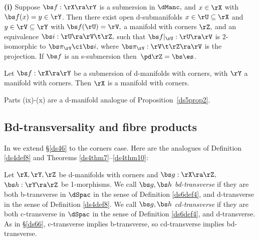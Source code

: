 \documentclass{article}
\begin{document}
\begin{thm}{\bf(i)}
 Suppose\/ $\bs f:\rX\ra\rY$ is a submersion in
$\dManc,$ and\/ $x\in\rX$ with\/ $\bs f(x)=y\in\rY$. Then there
exist open d-submanifolds $x\in\rU\subseteq\rX$ and\/
$y\in\rV\subseteq\rY$ with\/ $\bs f(\rU)=\rV,$ a manifold with
corners\/ $\rZ,$ and an equivalence $\bs i:\rU\ra\rV\t\rZ,$ such
that\/ $\bs f\vert_\rU:\rU\ra\rV$ is $2$-isomorphic to
$\bs\pi_\rV\ci\bs i,$ where $\bs\pi_\rV:\rV\t\rZ\ra\rV$ is the
projection. If\/ $\bs f$ is an s-submersion then\/~$\pd\rZ=\bs\es$.
\smallskip

 Let\/ $\bs f:\rX\ra\rY$ be a submersion of
d-manifolds with corners, with\/ $\rY$ a manifold with corners.
Then\/ $\rX$ is a manifold with corners.
\label{ds7thm6}
\end{thm}

Parts (ix)-(x) are a d-manifold analogue of
Proposition~\ref{ds5prop2}.

\subsection{Bd-transversality and fibre products}
\label{ds75}

In \cite[\S 7.6]{Joyc6} we extend \S\ref{ds46} to the corners case.
Here are the analogues of Definition \ref{ds4def8} and Theorems
\ref{ds4thm7}--\ref{ds4thm10}:

\begin{dfn} Let $\rX,\rY,\rZ$ be d-manifolds with corners and
$\bs g:\rX\ra\rZ,$ $\bs h:\rY\ra\rZ$ be 1-morphisms. We call $\bs
g,\bs h$ {\it bd-transverse\/} if they are both b-transverse in
$\dSpac$ in the sense of Definition \ref{ds6def4}, and d-transverse
in the sense of Definition \ref{ds4def8}. We call $\bs g,\bs h$ {\it
cd-transverse\/} if they are both c-transverse in $\dSpac$ in the
sense of Definition \ref{ds6def4}, and d-transverse. As in
\S\ref{ds66}, c-transverse implies b-transverse, so cd-transverse
implies bd-transverse.
\label{ds7def4}
\end{dfn}
\end{document}

